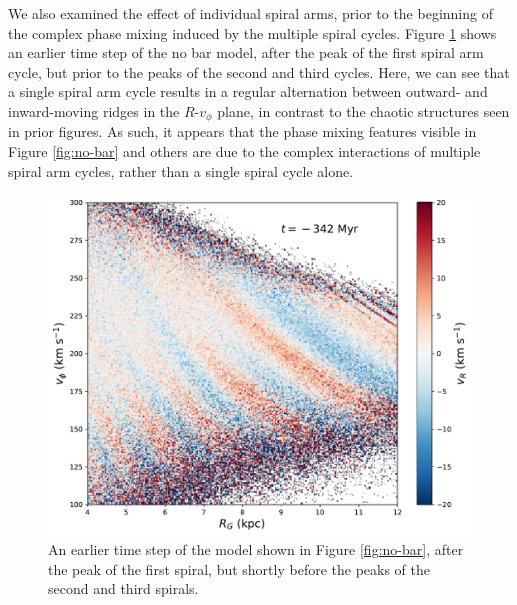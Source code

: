 \documentclass[10pt]{article}
\begin{document}
We also examined the effect of individual spiral arms, prior to the beginning of the complex phase mixing induced by the multiple spiral cycles. Figure \ref{fig:single-spiral} shows an earlier time step of the no bar model, after the peak of the first spiral arm cycle, but prior to the peaks of the second and third cycles. Here, we can see that a single spiral arm cycle results in a regular alternation between outward- and inward-moving ridges in the $R$-$v_\phi$ plane, in contrast to the chaotic structures seen in prior figures. As such, it appears that the phase mixing features visible in Figure \ref{fig:no-bar} and others are due to the complex interactions of multiple spiral arm cycles, rather than a single spiral cycle alone. 

\begin{figure}[h]
    \centering
    \includegraphics[width=\textwidth]{plots/single_spiral.pdf}
    \caption{An earlier time step of the model shown in Figure \ref{fig:no-bar}, after the peak of the first spiral, but shortly before the peaks of the second and third spirals.}
    \label{fig:single-spiral}
\end{figure}
\end{document}
